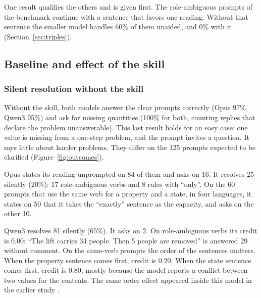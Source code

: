 \documentclass[11pt,a4paper]{article}
\begin{document}
One result qualifies the others and is given first. The role-ambiguous
prompts of the benchmark continue with a sentence that favors one
reading. Without that sentence the smaller model handles 60\% of them
unaided, and 0\% with it (Section~\ref{sec:triples}).

\subsection{Baseline and effect of the skill}

\subsubsection{Silent resolution without the skill}

Without the skill, both models answer the clear prompts correctly (Opus
97\%, Qwen3 95\%) and ask for missing quantities (100\% for both, counting
replies that declare the problem unanswerable). This last result holds
for an easy case: one value is missing from a one-step problem, and the
prompt invites a question. It says little about harder problems. They differ on the 125
prompts expected to be clarified (Figure~\ref{fig:outcomes}).

Opus states its reading unprompted on 84 of them and asks on 16. It
resolves 25 silently (20\%): 17 role-ambiguous verbs and 8 rules with
``only''. On the 60 prompts that use the same verb for a property and a
state, in four languages, it states on 50 that it takes the ``exactly''
sentence as the capacity, and asks on the other 10.

Qwen3 resolves 81 silently (65\%). It asks on 2. On role-ambiguous verbs
its credit is 0.00: ``The lift carries 34 people. Then 5 people are
removed'' is answered 29 without comment. On the same-verb prompts the
order of the sentences matters. When the property sentence comes first,
credit is 0.20. When the state sentence comes first, credit is 0.80,
mostly because the model reports a conflict between two values for the
contents. The same order effect appeared inside this model in the earlier
study \cite{dubray2026grammarllm}.
\end{document}
